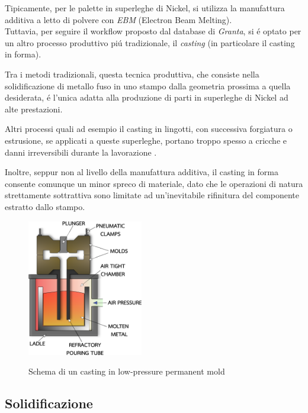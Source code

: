 \documentclass{article}
\begin{document}
    Tipicamente, per le palette in superleghe di Nickel, si utilizza la manufattura additiva
    a letto di polvere con \textit{EBM} (Electron Beam Melting). \\ 

    Tuttavia, per seguire il workflow proposto dal database di \textit{Granta}, si é optato
    per un altro processo produttivo piú tradizionale, il \textit{casting} (in particolare
    il casting in forma). 

    Tra i metodi tradizionali, questa tecnica produttiva, che consiste nella solidificazione di metallo fuso
    in uno stampo dalla geometria prossima a quella desiderata, é l'unica adatta alla produzione di parti 
    in superleghe di Nickel ad alte prestazioni. 

    Altri processi quali ad esempio il casting in lingotti, con successiva forgiatura o estrusione, se applicati a queste superleghe,
    portano troppo spesso a cricche e danni irreversibili durante la lavorazione \autocite{Mouritz}.

    Inoltre, seppur non al livello della manufattura additiva, il casting in forma consente comunque un minor spreco 
    di materiale, dato che le operazioni di natura strettamente sottrattiva sono limitate ad un'inevitabile
    rifinitura del componente estratto dallo stampo. 

    \begin{figure}[h!]
        \centering
         \label{low_press_mold}
        \includegraphics[width=0.45\textwidth]{Sources/pressurized_mold.eps}
        \caption{Schema di un casting in low-pressure permanent mold \autocite{Inkscape}}
    \end{figure}

    

    \clearpage

        \subsection{Solidificazione\label{Casting_solid}}
\end{document}
